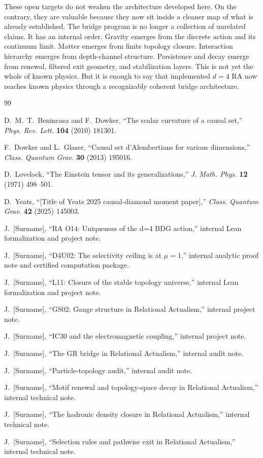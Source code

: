 \documentclass[11pt]{article}
\begin{document}
These open targets do not weaken the architecture developed here. On the contrary, they are valuable because they now sit inside a cleaner map of what is already established. The bridge program is no longer a collection of unrelated claims. It has an internal order. Gravity emerges from the discrete action and its continuum limit. Matter emerges from finite topology closure. Interaction hierarchy emerges from depth-channel structure. Persistence and decay emerge from renewal, filtered exit geometry, and stabilization layers. This is not yet the whole of known physics. But it is enough to say that implemented $d=4$ RA now reaches known physics through a recognizably coherent bridge architecture.

\begin{thebibliography}{99}

D.~M.~T.~Benincasa and F.~Dowker,
``The scalar curvature of a causal set,''
\emph{Phys. Rev. Lett.} \textbf{104} (2010) 181301.

F.~Dowker and L.~Glaser,
``Causal set d'Alembertians for various dimensions,''
\emph{Class. Quantum Grav.} \textbf{30} (2013) 195016.

D.~Lovelock,
``The Einstein tensor and its generalizations,''
\emph{J. Math. Phys.} \textbf{12} (1971) 498--501.

D.~Yeats,
``[Title of Yeats 2025 causal-diamond moment paper],''
\emph{Class. Quantum Grav.} \textbf{42} (2025) 145003.

J.~[Surname],
``RA O14: Uniqueness of the d=4 BDG action,''
internal Lean formalization and project note.

J.~[Surname],
``D4U02: The selectivity ceiling is at $\mu=1$,''
internal analytic proof note and certified computation package.

J.~[Surname],
``L11: Closure of the stable topology universe,''
internal Lean formalization and project note.

J.~[Surname],
``GS02: Gauge structure in Relational Actualism,''
internal project note.

J.~[Surname],
``IC30 and the electromagnetic coupling,''
internal project note.

J.~[Surname],
``The GR bridge in Relational Actualism,''
internal audit note.

J.~[Surname],
``Particle-topology audit,''
internal audit note.

J.~[Surname],
``Motif renewal and topology-space decay in Relational Actualism,''
internal technical note.

J.~[Surname],
``The hadronic density closure in Relational Actualism,''
internal technical note.

J.~[Surname],
``Selection rules and pathwise exit in Relational Actualism,''
internal technical note.

\end{thebibliography}
\end{document}
